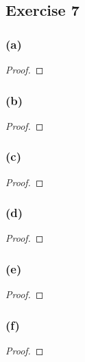 \documentclass[14pt]{extarticle}
\begin{document}
\subsection{Exercise 7}

\subsubsection{(a)}

\begin{proof}

\end{proof}

\subsubsection{(b)}

\begin{proof}

\end{proof}

\subsubsection{(c)}

\begin{proof}

\end{proof}

\subsubsection{(d)}

\begin{proof}

\end{proof}

\subsubsection{(e)}

\begin{proof}

\end{proof}

\subsubsection{(f)}

\begin{proof}

\end{proof}
\end{document}
